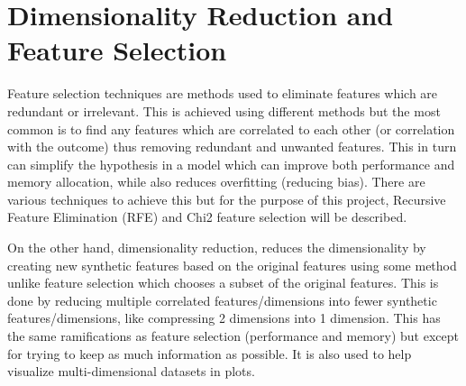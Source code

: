 \section{Dimensionality Reduction and Feature Selection}\label{sec:dimred}

Feature selection techniques are methods used to eliminate features which are redundant or irrelevant. This is achieved using different methods but the most common is to find any features which are correlated to each other (or correlation with the outcome) thus removing redundant and unwanted features. This in turn can simplify the hypothesis in a model which can improve both performance and memory allocation, while also reduces overfitting (reducing bias).  There are various techniques to achieve this but for the purpose of this project, Recursive Feature Elimination (RFE) and Chi2 feature selection will be described.

\noindent On the other hand, dimensionality reduction, reduces the dimensionality by creating new synthetic features based on the original features using some method unlike feature selection which chooses a subset of the original features. This is done by reducing multiple correlated features/dimensions into fewer synthetic features/dimensions, like compressing 2 dimensions into 1 dimension.  This has the same ramifications as feature selection (performance and memory) but except for trying to keep as much information as possible.  It is also used to help visualize multi-dimensional datasets in plots.   
 



